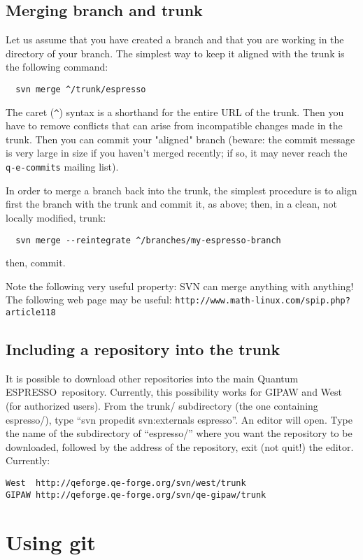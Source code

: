 \documentclass[12pt,a4paper]{article}
\def\qe{{\sc Quantum ESPRESSO}}
\begin{document}
\subsection{Merging branch and trunk}
\label{SubSec:Merge}
Let us assume that you have created a branch and that you are working
in the directory of your branch. The simplest way to keep it aligned
with the trunk is the following command:
\begin{verbatim}
  svn merge ^/trunk/espresso
\end{verbatim}
The caret (\texttt{\^}) syntax is a shorthand for the entire URL of the trunk.
Then you have to remove conflicts that can arise from incompatible changes
made in the trunk. Then you can commit your "aligned" branch (beware:
the commit message is very large in size if you haven't merged recently;
if so, it may never reach the \texttt{q-e-commits} mailing list).

In order to merge a branch back into the trunk, the simplest procedure is
to align first the branch with the trunk and commit it, as above; then,
in a clean, not locally modified, trunk:
\begin{verbatim}
  svn merge --reintegrate ^/branches/my-espresso-branch
\end{verbatim}
then, commit.

Note the following very useful property: SVN can merge anything with anything!
The following web page may be useful:
\texttt{http://www.math-linux.com/spip.php?article118}

\subsection{Including a repository into the trunk}
\label{SubSec:propedit}
It is possible to download other repositories into the main \qe\ repository.
Currently, this possibility works for GIPAW and West (for authorized users).
From the trunk/ subdirectory (the one containing espresso/), type
``svn propedit svn:externals espresso''.
An editor will open. Type the name of the subdirectory of ``espresso/''
where you want the repository to be downloaded, followed by the address of
the repository, exit (not quit!) the editor. Currently:
\begin{verbatim}
West  http://qeforge.qe-forge.org/svn/west/trunk
GIPAW http://qeforge.qe-forge.org/svn/qe-gipaw/trunk
\end{verbatim}

\section{Using git}
\label{Sec:git}
\end{document}
